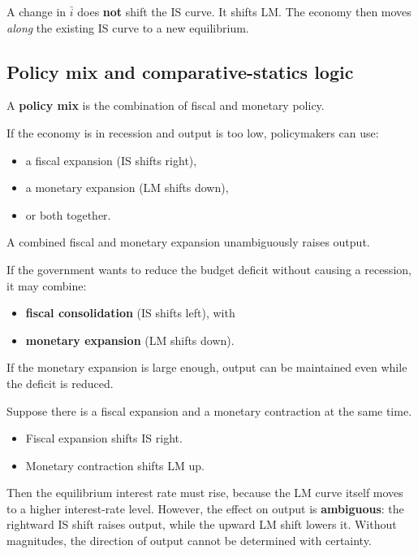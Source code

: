 \begin{commonmistake}
A change in $\bar{i}$ does \textbf{not} shift the IS curve. It shifts LM. The economy then moves \emph{along} the existing IS curve to a new equilibrium.
\end{commonmistake}

\subsection{Policy mix and comparative-statics logic}

A \textbf{policy mix} is the combination of fiscal and monetary policy.

\begin{policynote}[title={Policy Application: Expansionary policy mix}]
If the economy is in recession and output is too low, policymakers can use:
\begin{itemize}[leftmargin=1.5em]
\item a fiscal expansion (IS shifts right),
\item a monetary expansion (LM shifts down),
\item or both together.
\end{itemize}
A combined fiscal and monetary expansion unambiguously raises output.
\end{policynote}

\begin{policynote}[title={Policy Application: Fiscal consolidation with monetary expansion}]
If the government wants to reduce the budget deficit without causing a recession, it may combine:
\begin{itemize}[leftmargin=1.5em]
\item \textbf{fiscal consolidation} (IS shifts left), with
\item \textbf{monetary expansion} (LM shifts down).
\end{itemize}
If the monetary expansion is large enough, output can be maintained even while the deficit is reduced.
\end{policynote}

\begin{examplebox}[title={Worked Example: Simultaneous fiscal expansion and monetary contraction}]
Suppose there is a fiscal expansion and a monetary contraction at the same time.
\begin{itemize}[leftmargin=1.5em]
\item Fiscal expansion shifts IS right.
\item Monetary contraction shifts LM up.
\end{itemize}
Then the equilibrium interest rate must rise, because the LM curve itself moves to a higher interest-rate level. However, the effect on output is \textbf{ambiguous}: the rightward IS shift raises output, while the upward LM shift lowers it. Without magnitudes, the direction of output cannot be determined with certainty.
\end{examplebox}

